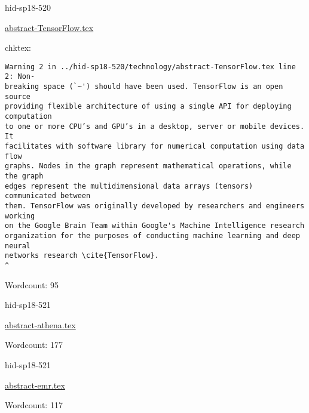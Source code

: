 \begin{IU}

hid-sp18-520

\href{https://github.com/cloudmesh-community/hid-sp18-520/blob/master//technology/abstract-TensorFlow.tex}{abstract-TensorFlow.tex}

 
chktex:
\begin{tiny}
\begin{verbatim}
Warning 2 in ../hid-sp18-520/technology/abstract-TensorFlow.tex line 2: Non-
breaking space (`~') should have been used. TensorFlow is an open source
providing flexible architecture of using a single API for deploying computation
to one or more CPU’s and GPU’s in a desktop, server or mobile devices. It
facilitates with software library for numerical computation using data flow
graphs. Nodes in the graph represent mathematical operations, while the graph
edges represent the multidimensional data arrays (tensors) communicated between
them. TensorFlow was originally developed by researchers and engineers working
on the Google Brain Team within Google's Machine Intelligence research
organization for the purposes of conducting machine learning and deep neural
networks research \cite{TensorFlow}.
^
\end{verbatim}
\end{tiny}

Wordcount: 95

\end{IU}



\begin{IU}

hid-sp18-521

\href{https://github.com/cloudmesh-community/hid-sp18-521/blob/master//technology/abstract-athena.tex}{abstract-athena.tex}

 

Wordcount: 177

\end{IU}



\begin{IU}

hid-sp18-521

\href{https://github.com/cloudmesh-community/hid-sp18-521/blob/master//technology/abstract-emr.tex}{abstract-emr.tex}

 

Wordcount: 117

\end{IU}

